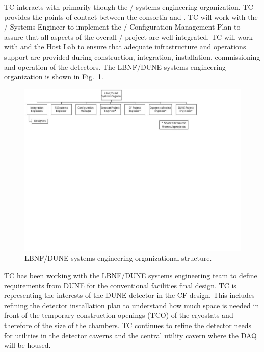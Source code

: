  TC interacts with  primarily though the
/ systems engineering organization. TC
provides the points of contact between the consortia and .
TC will work with the / Systems Engineer to
implement the / Configuration Management Plan
to assure that all aspects of the overall /
project are well integrated. TC will work with  and the
Host Lab to ensure that adequate infrastructure and operations support
are provided during construction, integration, installation,
commissioning and operation of the detectors. The LBNF/DUNE systems
engineering organization is shown in Fig.~\ref{fig:DUNE_SE_org}.
\begin{figure}[htb]
  \begin{center}
    \includegraphics[width=\textwidth]{far-detector-generic/figures/TC_SE_Org_Chart}
    \caption{LBNF/DUNE systems engineering organizational structure.}
    \label{fig:DUNE_SE_org}
  \end{center}
\end{figure}
TC has been working with the LBNF/DUNE systems engineering team to
define requirements from DUNE for the conventional facilities final
design. TC is representing the interests of the DUNE detector in the
CF design. This includes refining the detector installation plan to
understand how much space is needed in front of the temporary
construction openings (TCO) of the cryostats and therefore of the size
of the chambers. TC continues to refine the detector needs for
utilities in the detector caverns and the central utility cavern where
the DAQ will be housed.

